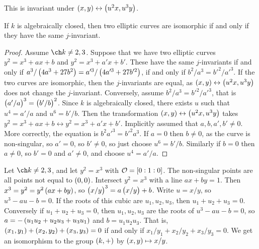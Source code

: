 This is invariant under $ \br{x, y} \leftrightarrow \br{u^2x, u^3y} $.

\pagebreak

\begin{proposition}
If $ k $ is algebraically closed, then two elliptic curves are isomorphic if and only if they have the same $ j $-invariant.
\end{proposition}

\begin{proof}
Assume $ \ch k \ne 2, 3 $. Suppose that we have two elliptic curves $ y^2 = x^3 + ax + b $ and $ y^2 = x^3 + a'x + b' $. These have the same $ j $-invariants if and only if $ a^3 / \br{4a^3 + 27b^2} = a'^3 / \br{4a'^3 + 27b'^2} $, if and only if $ b^2 / a^3 = b'^2 / a'^3 $. If the two curves are isomorphic, then the $ j $-invariants are equal, as $ \br{x, y} \leftrightarrow \br{u^2x, u^3y} $ does not change the $ j $-invariant. Conversely, assume $ b^2 / a^3 = b'^2 / a'^3 $, that is $ \br{a' / a}^3 = \br{b' / b}^2 $. Since $ k $ is algebraically closed, there exists $ u $ such that $ u^4 = a' / a $ and $ u^6 = b' / b $. Then the transformation $ \br{x, y} \leftrightarrow \br{u^2x, u^3y} $ takes $ y^2 = x^3 + ax + b \leftrightarrow y^2 = x^3 + a'x + b' $. Implicitly assumed that $ a, b, a', b' \ne 0 $. More correctly, the equation is $ b^2a'^3 = b'^2a^3 $. If $ a = 0 $ then $ b \ne 0 $, as the curve is non-singular, so $ a' = 0 $, so $ b' \ne 0 $, so just choose $ u^6 = b' / b $. Similarly if $ b = 0 $ then $ a \ne 0 $, so $ b' = 0 $ and $ a' \ne 0 $, and choose $ u^4 = a' / a $.
\end{proof}


\begin{example}
Let $ \ch k \ne 2, 3 $, and let $ y^2 = x^3 $ with $ \OOO = \sbr{0 : 1 : 0} $. The non-singular points are all points not equal to $ \br{0, 0} $. Intersect $ y^2 = x^3 $ with a line $ ax + by = 1 $. Then $ x^3 = y^2 = y^2\br{ax + by} $, so $ \br{x / y}^3 = a\br{x / y} + b $. Write $ u = x / y $, so $ u^3 - au - b = 0 $. If the roots of this cubic are $ u_1, u_2, u_3 $, then $ u_1 + u_2 + u_3 = 0 $. Conversely if $ u_1 + u_2 + u_3 = 0 $, then $ u_1, u_2, u_3 $ are the roots of $ u^3 - au - b = 0 $, so $ a = -\br{u_1u_2 + u_2u_3 + u_3u_1} $ and $ b = u_1u_2u_3 $. That is, $ \br{x_1, y_1} + \br{x_2, y_2} + \br{x_3, y_3} = 0 $ if and only if $ x_1 / y_1 + x_2 / y_2 + x_3 / y_3 = 0 $. We get an isomorphism to the group $ \br{k, +} $ by $ \br{x, y} \mapsto x / y $.
\end{example}


